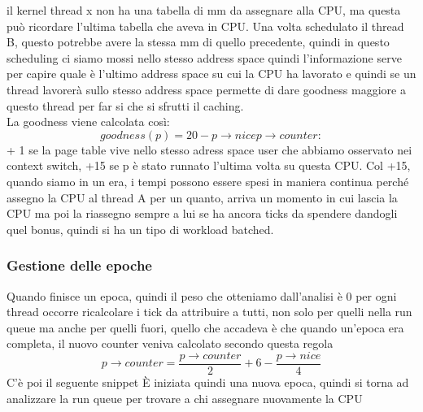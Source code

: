 \documentclass[12pt, oneside]{extbook}
\begin{document}
il kernel thread x non ha una tabella di mm da assegnare alla CPU, ma questa può ricordare l'ultima tabella che aveva in CPU. Una volta schedulato il thread B, questo potrebbe avere la stessa mm di quello precedente, quindi in questo scheduling ci siamo mossi nello stesso address space quindi l'informazione serve per capire quale è l'ultimo address space su cui la CPU ha lavorato e quindi se un thread lavorerà sullo stesso address space permette di dare goodness maggiore a questo thread per far si che si sfrutti il caching.\\La goodness viene calcolata così:
\begin{equation}
goodness(p) = 20 - p \rightarrow nice
p \rightarrow counter :
\end{equation}
+ 1 se la page table vive nello stesso adress space user che abbiamo osservato nei context switch, +15 se p è stato runnato l'ultima volta su questa CPU. Col +15, quando siamo in un era, i tempi possono essere spesi in maniera continua perché assegno la CPU al thread A per un quanto, arriva un momento in cui lascia la CPU ma poi la riassegno sempre a lui se ha ancora ticks da spendere dandogli quel bonus, quindi si ha un tipo di workload batched.
\subsubsection{Gestione delle epoche}
Quando finisce un epoca, quindi il peso che otteniamo dall'analisi è 0 per ogni thread occorre ricalcolare i tick da attribuire a tutti, non solo per quelli nella run queue ma anche per quelli fuori, quello che accadeva è che quando un'epoca era completa, il nuovo counter veniva calcolato secondo questa regola
\begin{equation}
p \rightarrow counter = \frac{p \rightarrow counter}{2} + 6 - \frac{p \rightarrow nice}{4}
\end{equation}
C'è poi il seguente snippet
È iniziata quindi una nuova epoca, quindi si torna ad analizzare la run queue per trovare a chi assegnare nuovamente la CPU
\end{document}
